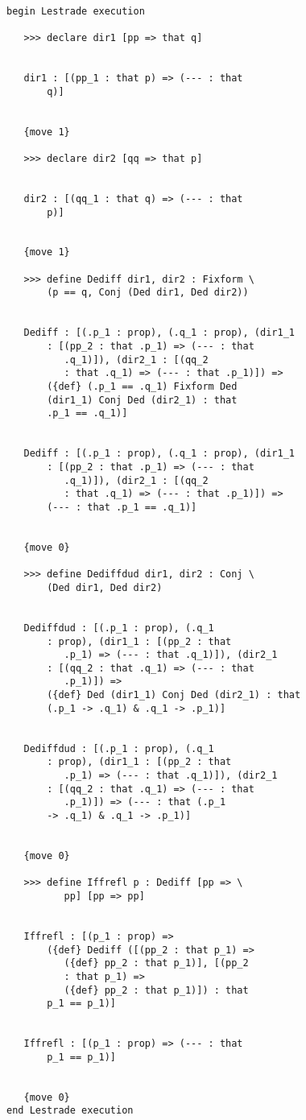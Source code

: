 \documentclass[12pt]{article}
\begin{document}
\begin{verbatim}

begin Lestrade execution

   >>> declare dir1 [pp => that q]


   dir1 : [(pp_1 : that p) => (--- : that 
       q)]


   {move 1}

   >>> declare dir2 [qq => that p]


   dir2 : [(qq_1 : that q) => (--- : that 
       p)]


   {move 1}

   >>> define Dediff dir1, dir2 : Fixform \
       (p == q, Conj (Ded dir1, Ded dir2))


   Dediff : [(.p_1 : prop), (.q_1 : prop), (dir1_1 
       : [(pp_2 : that .p_1) => (--- : that 
          .q_1)]), (dir2_1 : [(qq_2 
          : that .q_1) => (--- : that .p_1)]) => 
       ({def} (.p_1 == .q_1) Fixform Ded 
       (dir1_1) Conj Ded (dir2_1) : that 
       .p_1 == .q_1)]


   Dediff : [(.p_1 : prop), (.q_1 : prop), (dir1_1 
       : [(pp_2 : that .p_1) => (--- : that 
          .q_1)]), (dir2_1 : [(qq_2 
          : that .q_1) => (--- : that .p_1)]) => 
       (--- : that .p_1 == .q_1)]


   {move 0}

   >>> define Dediffdud dir1, dir2 : Conj \
       (Ded dir1, Ded dir2)


   Dediffdud : [(.p_1 : prop), (.q_1 
       : prop), (dir1_1 : [(pp_2 : that 
          .p_1) => (--- : that .q_1)]), (dir2_1 
       : [(qq_2 : that .q_1) => (--- : that 
          .p_1)]) => 
       ({def} Ded (dir1_1) Conj Ded (dir2_1) : that 
       (.p_1 -> .q_1) & .q_1 -> .p_1)]


   Dediffdud : [(.p_1 : prop), (.q_1 
       : prop), (dir1_1 : [(pp_2 : that 
          .p_1) => (--- : that .q_1)]), (dir2_1 
       : [(qq_2 : that .q_1) => (--- : that 
          .p_1)]) => (--- : that (.p_1 
       -> .q_1) & .q_1 -> .p_1)]


   {move 0}

   >>> define Iffrefl p : Dediff [pp => \
          pp] [pp => pp]


   Iffrefl : [(p_1 : prop) => 
       ({def} Dediff ([(pp_2 : that p_1) => 
          ({def} pp_2 : that p_1)], [(pp_2 
          : that p_1) => 
          ({def} pp_2 : that p_1)]) : that 
       p_1 == p_1)]


   Iffrefl : [(p_1 : prop) => (--- : that 
       p_1 == p_1)]


   {move 0}
end Lestrade execution
\end{verbatim}
\end{document}
